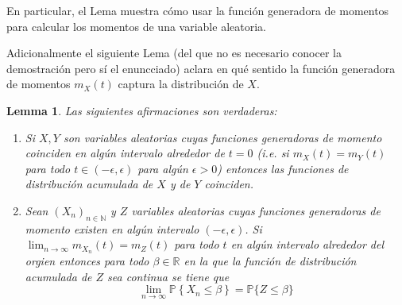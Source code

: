 \documentclass[12pt]{amsart}
\newtheorem{lemma}{Lemma}[section]
\theoremstyle{definition}
\renewcommand{\leq}{\leqslant}
\newcommand{\PP}{\ensuremath{\mathbb{P}}}
\newcommand{\RR}{\ensuremath{\mathbb{R}}}
\begin{document}
En particular, el Lema muestra cómo usar la función generadora de momentos para calcular los momentos de una variable aleatoria.

Adicionalmente el siguiente Lema (del que no es necesario conocer la demostración pero sí el enuncciado) aclara en qué sentido la función generadora de momentos $m_X(t)$ captura la distribución de $X$.

\begin{lemma} Las siguientes afirmaciones son verdaderas:
    \begin{enumerate}
        \item Si $X,Y$ son variables aleatorias cuyas funciones generadoras de momento coinciden en algún intervalo alrededor de $t=0$ (i.e. si $m_X(t)=m_Y(t)$ para todo $t\in (-\epsilon,\epsilon)$ para algún $\epsilon>0$) entonces las funciones de distribución acumulada de $X$ y de $Y$ coinciden.
        \item Sean $(X_n)_{n\in \mathbb{N}}$ y $Z$ variables aleatorias cuyas funciones generadoras de momento existen en algún intervalo $(-\epsilon,\epsilon)$. Si $\lim_{n\rightarrow \infty} m_{X_n}(t) = m_Z(t)$ para todo $t$ en algún intervalo alrededor del orgien entonces para todo $\beta\in\RR$ en la que la función de distribución acumulada de $Z$ sea continua se tiene que 
        \[\lim_{n\rightarrow \infty}\PP\left\{X_n\leq \beta\right\} = \PP\{Z\leq \beta\}\] 
    \end{enumerate}
    
\end{lemma}
\end{document}
